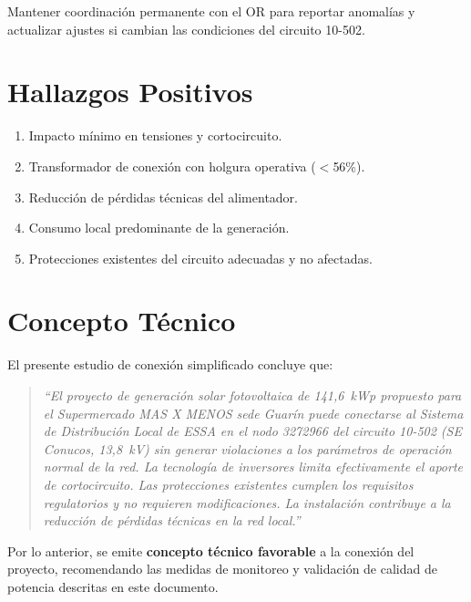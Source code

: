 Mantener coordinación permanente con el OR para reportar anomalías y actualizar ajustes si cambian las condiciones del circuito 10-502.

\section{Hallazgos Positivos}

\begin{enumerate}
    \item Impacto mínimo en tensiones y cortocircuito.
    \item Transformador de conexión con holgura operativa ($<$56\%).
    \item Reducción de pérdidas técnicas del alimentador.
    \item Consumo local predominante de la generación.
    \item Protecciones existentes del circuito adecuadas y no afectadas.
\end{enumerate}

\section{Concepto Técnico}

El presente estudio de conexión simplificado concluye que:

\begin{quote}
\textit{``El proyecto de generación solar fotovoltaica de 141,6~kWp propuesto para el Supermercado MAS X MENOS sede Guarín puede conectarse al Sistema de Distribución Local de ESSA en el nodo 3272966 del circuito 10-502 (SE Conucos, 13,8~kV) sin generar violaciones a los parámetros de operación normal de la red. La tecnología de inversores limita efectivamente el aporte de cortocircuito. Las protecciones existentes cumplen los requisitos regulatorios y no requieren modificaciones. La instalación contribuye a la reducción de pérdidas técnicas en la red local.''}
\end{quote}

Por lo anterior, se emite \textbf{concepto técnico favorable} a la conexión del proyecto, recomendando las medidas de monitoreo y validación de calidad de potencia descritas en este documento.
